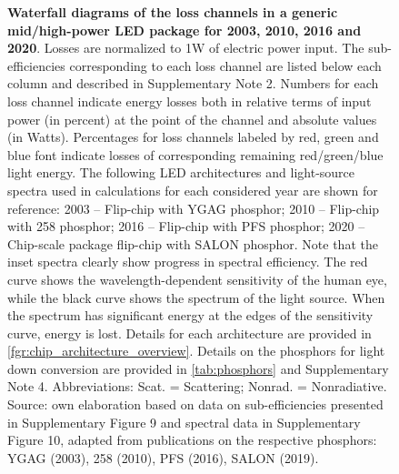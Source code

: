 \documentclass[parskip=full]{article}
\begin{document}
\begin{figure}[H]
 \caption{\textbf{Waterfall diagrams of the loss channels in a generic mid/high-power LED package for 2003, 2010, 2016 and 2020}. Losses are normalized to 1W of electric power input. The sub-efficiencies corresponding to each loss channel are listed below each column and described in Supplementary Note 2. Numbers for each loss channel indicate energy losses both in relative terms of input power (in percent) at the point of the channel and absolute values (in Watts). Percentages for loss channels labeled by red, green and blue font indicate losses of corresponding remaining red/green/blue light energy. The following LED architectures and light-source spectra used in calculations for each considered year are shown for reference: 2003 – Flip-chip with YGAG phosphor; 2010 – Flip-chip with 258 phosphor; 2016 – Flip-chip with PFS phosphor; 2020 – Chip-scale package flip-chip with SALON phosphor. Note that the inset spectra clearly show progress in spectral efficiency. The red curve shows the wavelength-dependent sensitivity of the human eye, while the black curve shows the spectrum of the light source. When the spectrum has significant energy at the edges of the sensitivity curve, energy is lost. Details for each architecture are provided in \cref{fgr:chip_architecture_overview}.  Details on the phosphors for light down conversion are provided in \cref{tab:phosphors} and Supplementary Note 4. Abbreviations: Scat. = Scattering; Nonrad. = Nonradiative. Source: own elaboration based on data on sub-efficiencies presented in Supplementary Figure 9 and spectral data in Supplementary Figure 10, adapted from publications on the respective phosphors: YGAG (2003)\cite{Mueller2002}, 258 (2010)\cite{MuellerMach2005}, PFS (2016)\cite{Murphy2015}, SALON (2019)\cite{Hoerder2019}.}
 \label{fgr:waterfall}
\end{figure}
\end{document}
